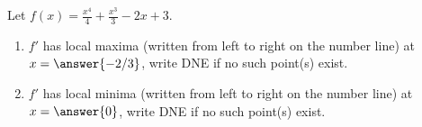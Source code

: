\documentclass{ximera}
\author{Gregory Hartman \and Matthew Carr}
\begin{document}
\begin{exercise}






Let $f(x)=\frac{x^4}{4}+\frac{x^3}{3}-2x+3$.
\begin{enumerate}
\item		$f'$ has local maxima (written from left to right on the number line) at $x=\answer{-2/3}$, write DNE if no such point(s) exist.
\item		$f'$ has local minima (written from left to right on the number line) at $x=\answer{0}$, write DNE if no such point(s) exist.
\end{enumerate}

\end{exercise}
\end{document}
